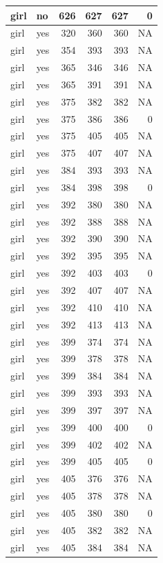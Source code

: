 \documentclass[man]{apa6}
\begin{document}
\begin{tabular}{l|l|r|r|r|r}
\hline
girl & no & 626 & 627 & 627 & 0\\
\hline
girl & yes & 320 & 360 & 360 & NA\\
\hline
girl & yes & 354 & 393 & 393 & NA\\
\hline
girl & yes & 365 & 346 & 346 & NA\\
\hline
girl & yes & 365 & 391 & 391 & NA\\
\hline
girl & yes & 375 & 382 & 382 & NA\\
\hline
girl & yes & 375 & 386 & 386 & 0\\
\hline
girl & yes & 375 & 405 & 405 & NA\\
\hline
girl & yes & 375 & 407 & 407 & NA\\
\hline
girl & yes & 384 & 393 & 393 & NA\\
\hline
girl & yes & 384 & 398 & 398 & 0\\
\hline
girl & yes & 392 & 380 & 380 & NA\\
\hline
girl & yes & 392 & 388 & 388 & NA\\
\hline
girl & yes & 392 & 390 & 390 & NA\\
\hline
girl & yes & 392 & 395 & 395 & NA\\
\hline
girl & yes & 392 & 403 & 403 & 0\\
\hline
girl & yes & 392 & 407 & 407 & NA\\
\hline
girl & yes & 392 & 410 & 410 & NA\\
\hline
girl & yes & 392 & 413 & 413 & NA\\
\hline
girl & yes & 399 & 374 & 374 & NA\\
\hline
girl & yes & 399 & 378 & 378 & NA\\
\hline
girl & yes & 399 & 384 & 384 & NA\\
\hline
girl & yes & 399 & 393 & 393 & NA\\
\hline
girl & yes & 399 & 397 & 397 & NA\\
\hline
girl & yes & 399 & 400 & 400 & 0\\
\hline
girl & yes & 399 & 402 & 402 & NA\\
\hline
girl & yes & 399 & 405 & 405 & 0\\
\hline
girl & yes & 405 & 376 & 376 & NA\\
\hline
girl & yes & 405 & 378 & 378 & NA\\
\hline
girl & yes & 405 & 380 & 380 & 0\\
\hline
girl & yes & 405 & 382 & 382 & NA\\
\hline
girl & yes & 405 & 384 & 384 & NA\\

\end{tabular}
\end{document}
